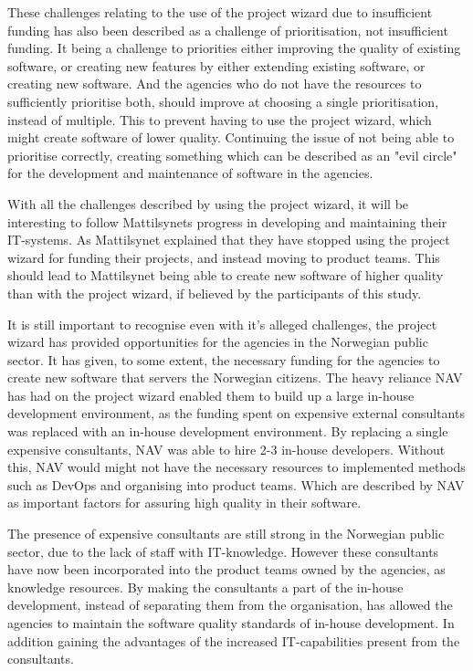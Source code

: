 These challenges relating to the use of the project wizard due to insufficient funding has also been described as a challenge of prioritisation, not insufficient funding. It being a challenge to priorities either improving the quality of existing software, or creating new features by either extending existing software, or creating new software. And the agencies who do not have the resources to sufficiently prioritise both, should improve at choosing a single prioritisation, instead of multiple. This to prevent having to use the project wizard, which might create software of lower quality. Continuing the issue of not being able to prioritise correctly, creating something which can be described as an "evil circle" for the development and maintenance of software in the agencies.

With all the challenges described by using the project wizard, it will be interesting to follow Mattilsynets progress in developing and maintaining their IT-systems. As Mattilsynet explained that they have stopped using the project wizard for funding their projects, and instead moving to product teams. This should lead to Mattilsynet being able to create new software of higher quality than with the project wizard, if believed by the participants of this study.

It is still important to recognise even with it's alleged challenges, the project wizard has provided opportunities for the agencies in the Norwegian public sector. It has given, to some extent, the necessary funding for the agencies to create new software that servers the Norwegian citizens. The heavy reliance NAV has had on the project wizard enabled them to build up a large in-house development environment, as the funding spent on expensive external consultants was replaced with an in-house development environment. By replacing a single expensive consultants, NAV was able to hire 2-3 in-house developers. Without this, NAV would might not have the necessary resources to implemented methods such as DevOps and organising into product teams. Which are described by NAV as important factors for assuring high quality in their software.

The presence of expensive consultants are still strong in the Norwegian public sector, due to the lack of staff with IT-knowledge. However these consultants have now been incorporated into the product teams owned by the agencies, as knowledge resources. By making the consultants a part of the in-house development, instead of separating them from the organisation, has allowed the agencies to maintain the software quality standards of in-house development. In addition gaining the advantages of the increased IT-capabilities present from the consultants.

